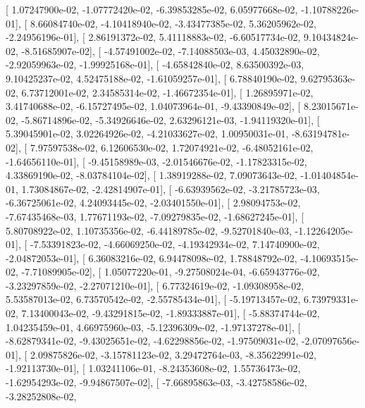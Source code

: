 \documentclass{article}
\begin{document}
       [  1.07247900e-02,  -1.07772420e-02,  -6.39853285e-02,
          6.05977668e-02,  -1.10788226e-01],
       [  8.66084740e-02,  -4.10418940e-02,  -3.43477385e-02,
          5.36205962e-02,  -2.24956196e-01],
       [  2.86191372e-02,   5.41118883e-02,  -6.60517734e-02,
          9.10434824e-02,  -8.51685907e-02],
       [ -4.57491002e-02,  -7.14088503e-03,   4.45032890e-02,
         -2.92059963e-02,  -1.99925168e-01],
       [ -4.65842840e-02,   8.63500392e-03,   9.10425237e-02,
          4.52475188e-02,  -1.61059257e-01],
       [  6.78840190e-02,   9.62795363e-02,   6.73712001e-02,
          2.34585314e-02,  -1.46672354e-01],
       [  1.26895971e-02,   3.41740688e-02,  -6.15727495e-02,
          1.04073964e-01,  -9.43390849e-02],
       [  8.23015671e-02,  -5.86714896e-02,  -5.34926646e-02,
          2.63296121e-03,  -1.94119320e-01],
       [  5.39045901e-02,   3.02264926e-02,  -4.21033627e-02,
          1.00950031e-01,  -8.63194781e-02],
       [  7.97597538e-02,   6.12606530e-02,   1.72074921e-02,
         -6.48052161e-02,  -1.64656110e-01],
       [ -9.45158989e-03,  -2.01546676e-02,  -1.17823315e-02,
          4.33869190e-02,  -8.03784104e-02],
       [  1.38919288e-02,   7.09073643e-02,  -1.01404854e-01,
          1.73084867e-02,  -2.42814907e-01],
       [ -6.63939562e-02,  -3.21785723e-03,  -6.36725061e-02,
          4.24093445e-02,  -2.03401550e-01],
       [  2.98094753e-02,  -7.67435468e-03,   1.77671193e-02,
         -7.09279835e-02,  -1.68627245e-01],
       [  5.80708922e-02,   1.10735356e-02,  -6.44189785e-02,
         -9.52701840e-03,  -1.12264205e-01],
       [ -7.53391823e-02,  -4.66069250e-02,  -4.19342934e-02,
          7.14740900e-02,  -2.04872053e-01],
       [  6.36083216e-02,   6.94478098e-02,   1.78848792e-02,
         -4.10693515e-02,  -7.71089905e-02],
       [  1.05077220e-01,  -9.27508024e-04,  -6.65943776e-02,
         -3.23297859e-02,  -2.27071210e-01],
       [  6.77324619e-02,  -1.09308958e-02,   5.53587013e-02,
          6.73570542e-02,  -2.55785434e-01],
       [ -5.19713457e-02,   6.73979331e-02,   7.13400043e-02,
         -9.43291815e-02,  -1.89333887e-01],
       [ -5.88374744e-02,   1.04235459e-01,   4.66975960e-03,
         -5.12396309e-02,  -1.97137278e-01],
       [ -8.62879341e-02,  -9.43025651e-02,  -4.62298856e-02,
         -1.97509031e-02,  -2.07097656e-01],
       [  2.09875826e-02,  -3.15781123e-02,   3.29472764e-03,
         -8.35622991e-02,  -1.92113730e-01],
       [  1.03241106e-01,  -8.24353608e-02,   1.55736473e-02,
         -1.62954293e-02,  -9.94867507e-02],
       [ -7.66895863e-03,  -3.42758586e-02,  -3.28252808e-02,
\end{document}
